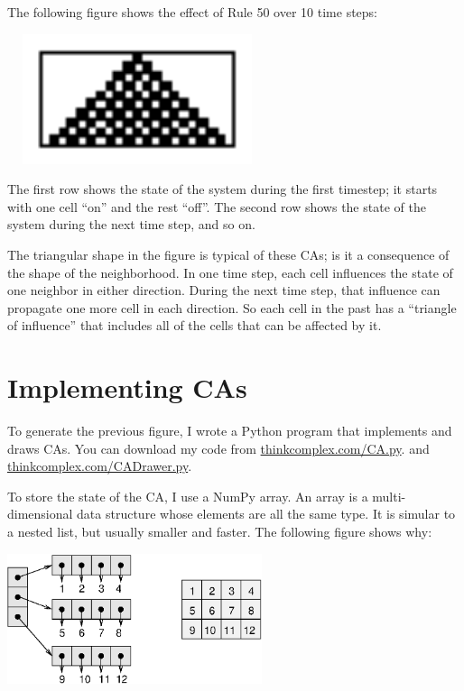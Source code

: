 \documentclass[10pt]{book}
\begin{document}
The following figure shows the effect of Rule 50 over 10
time steps:

\beforefig
\centerline{\includegraphics[width=3.0in,height=1.5in]{figs/rule50.eps}}
\afterfig

The first row shows the state of the system during the first
timestep; it starts with one cell ``on'' and the rest ``off''.
The second row shows the state of the system during the
next time step, and so on.

The triangular shape in the figure is typical of these CAs; is it a
consequence of the shape of the neighborhood.  In one time step, each
cell influences the state of one neighbor in either direction.  During
the next time step, that influence can propagate one more cell in each
direction.  So each cell in the past has a ``triangle of influence''
that includes all of the cells that can be affected by it.


\section{Implementing CAs}

To generate the previous figure, I wrote a Python program that
implements and draws CAs.
You can download my code from \url{thinkcomplex.com/CA.py}.
and \url{thinkcomplex.com/CADrawer.py}.

To store the state of the CA, I use a NumPy array.  An array is a
multi-dimensional data structure whose elements are all the same type.
It is simular to a nested list, but usually smaller and faster.  The
following figure shows why:

\beforefig
\centerline{\includegraphics[height=1.5in]{figs/array.eps}}
\afterfig
\end{document}
